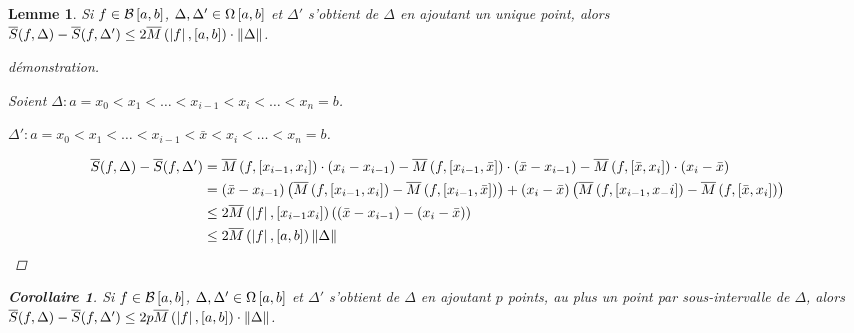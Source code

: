 \documentclass{report}
\newcommand*{\norme}[1]{\left\| #1 \right\|}
\newcommand*{\abs}[1]{\left| #1 \right|}
\newtheorem*{lem}{Lemme}
\newtheorem*{coro}{Corollaire}
\theoremstyle{definition}
\theoremstyle{remark}
\begin{document}
	\begin{lem}
		Si $f \in \bornee$, $\Delta,\Delta' \in \partitions$ et $\Delta'$ s'obtient de $\Delta$ en ajoutant un unique point, alors $\ssup{f} - \ssup{f}[\Delta'] \leq 2\msup{\abs{f}}[a,b] \cdot \norme{\Delta}$.

		\begin{proof}[d\'emonstration]~

			Soient $\Delta:a=x_0 < x_1 < \dotsc < x_{i-1} < x_i < \dotsc < x_n=b$.

			$\Delta':a=x_0 < x_1 < \dotsc < x_{i-1} < \bar{x} < x_i < \dotsc < x_n=b$.

			\begin{align*}
				\ssup{f} - \ssup{f}[\Delta'] &= \msup{f}[x_{i-1},x_i] \cdot \left( x_i-x_{i-1} \right) - \msup{f}[x_{i-1},\bar{x}] \cdot \left( \bar{x}-x_{i-1} \right) - \msup{f}[\bar{x},x_i] \cdot \left( x_i-\bar{x} \right)\\
				&= \left( \bar{x}-x_{i-1} \right) \left( \msup{f}[x_{i-1},x_i] - \msup{f}[x_{i-1},\bar{x}] \right) + \left( x_i-\bar{x} \right) \left( \msup{f}[x_{i-1},x_-i] - \msup{f}[\bar{x},x_i] \right)\\
				&\leq 2\msup{\abs{f}}[x_{i-1}x_i] \left( \left( \bar{x}-x_{i-1} \right) - \left( x_i-\bar{x} \right) \right)\\
				&\leq 2\msup{\abs{f}} \norme{\Delta}
			\end{align*}
		\end{proof}

		\begin{coro}
			Si $f \in \bornee$, $\Delta,\Delta' \in \partitions$ et $\Delta'$ s'obtient de $\Delta$ en ajoutant $p$ points, au plus un point par sous-intervalle de $\Delta$, alors $\ssup{f} - \ssup{f}[\Delta'] \leq 2p\msup{\abs{f}}[a,b] \cdot \norme{\Delta}$.
		\end{coro}
	\end{lem}
\end{document}
